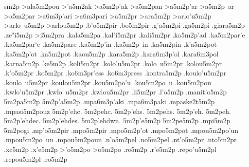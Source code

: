 {sm2p
>ala5m2pou   %
>'a5m2ak     %
>a5m2p'ak
>a5m2pan     %
>a5m2p'ar    %
>a5m2p~ar
>a5m2par
  >a6m3p'ari   %
  >a6m3pari
>a5m2pr      %
>ara5m2p     %
>arlo'u5m2p  %
>arlo~u5m2p
>arlou5m2p
.b'o5m2pir   %
.bo5m2pir    %
.g'a5m2pi    %
.ga5m2pi
.giara5m2p 		%
.ze"i5m2p    %
>i5m2pra     %
.kala5m2pa   %
.kal'i5m2pr  %
.kali5m2pr
.ka5m2p'ad   %
.ka5m2par'e  %
.ka5m2par`e
.ka5m2pare
.ka5m2p'in   %
.ka5m2p~in
.ka5m2pin
.k'a5m2pot   %
.ka5m2p'ot
.ka5m2pot
.kaou5m2p    %
.kara5m2p    %
  .kara6m3p'ol %
  .kara6m3pol
.karna5m2p   %
.ke5m2p      %
.koli5m2pr   %
.kolo'u5m2pr %
.kolo~u5m2pr
.kolou5m2pr
.k'o5m2pr    %
.ko5m2pr
  .ko6m3pr'ess %
  .ko6m3press
.kontra5m2p  %
.koulo'u5m2pr %
.koulo~u5m2pr
.koulou5m2pr
.kou5m2po'u  %
.kou5m2po~u
.kou5m2pou
.kwlo'u5m2pr %
.kwlo~u5m2pr
.kwlou5m2pr
.li5m2pr     %
.l'o5m2p     %
.manit'o5m2p %
5m2pa5m2p    %
5m2p'a5m2p   %
  .mpa6m3p'aki %
  .mpa6m3paki
.mpaske2t5m2p  %
.mpasi5m2pouz %
5m2p'ehc.    %
5m2pehc.
5m2p'ehs.
5m2pehs.
5m2p'eh.
5m2peh.
5m2p'ehdec.
5m2p'ehdes.
5m2p'ehdwn.
5m2p'e5m2p   %
5m2pe5m2p
.mpi5m2p     %
5m2pogi      %
.mp'o5m2pir  %
.mpo5m2pir   %
.mpo5m2p'ot  %
.mpo5m2pot
.mpou5m2po'un %
.mpou5m2po~un
.mpou5m2poun
.n'o5m2pel   %
.no5m2pel
.nt'o5m2pr   %
.nto5m2pr
.xe5m2p      %
.x'e5m2p
>'o5m2po     %
>o5m2po
.re5m2p      %
.r'e5m2p     %
.repo'u5m2pl %
.repou5m2pl  %
.ro5m2p      %
}
